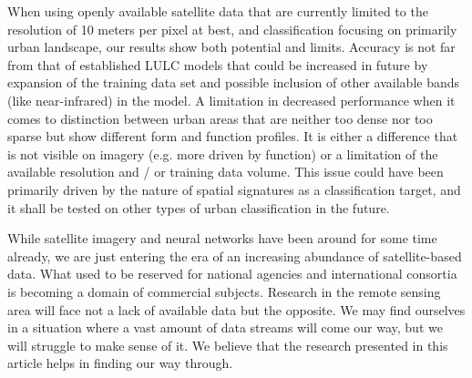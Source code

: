 When using openly available satellite data that are currently limited to the resolution
of 10 meters per pixel at best, and classification focusing on primarily urban landscape,
our results show both potential and limits. Accuracy is not far from
that of established LULC models that could be increased in future by expansion of the training
data set and possible inclusion of other available bands (like near-infrared) in the model.
A limitation in decreased performance when it comes to distinction between urban areas that
are neither too dense nor too sparse but show different form and function profiles. It is
either a difference that is not visible on imagery (e.g. more driven by function) or a
limitation of the available resolution and / or training data volume. This issue could have
been primarily driven by the nature of spatial signatures as a classification target, and
it shall be tested on other types of urban classification in the future.

While satellite imagery and neural networks have been around for some time already, we
are just entering the era of an increasing abundance of satellite-based data. What used
to be reserved for national agencies and international consortia is becoming a domain of
commercial subjects. Research in the remote sensing area will face not a lack of
available data but the opposite. We may find ourselves in a situation where a vast
amount of data streams will come our way, but we will struggle to make sense of it. We
believe that the research presented in this article helps in finding our way through.
